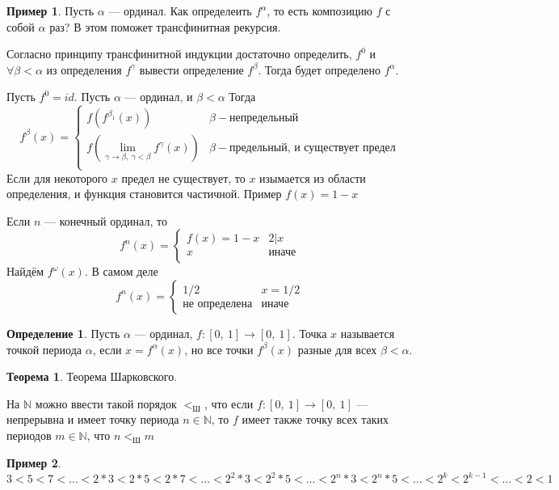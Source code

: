 \documentclass[12pt,oneside]{article}
\theoremstyle{definition}
\newtheorem{definition}{Определение}
\newtheorem{exmp}{Пример}[section]
\newtheorem{theorem}{Теорема}[section]
\begin{document}
\begin{exmp}

Пусть $\alpha$ --- ординал. Как определеить $f^{\alpha}$, то есть композицию $f$ с собой $\alpha$ раз? В этом поможет трансфинитная рекурсия.

Согласно принципу трансфинитной индукции достаточно определить, $f^0$ и $\forall \beta < \alpha$ из определения $f^{\gamma}$ вывести определение $f^{\beta}$. Тогда будет определено $f^{\alpha}$.

Пусть $f^0 = id$. Пусть $\alpha$ --- ординал, и $\beta < \alpha$ Тогда
$$f^{\beta}(x) = 
\begin{cases}
f(f^{\beta_1}(x))  & \beta - \textrm{непредельный} \\
f(\lim_{\gamma \rightarrow \beta, \ \gamma<\beta}f^{\gamma}(x)) & \beta - \textrm{предельный, и существует предел}\\
\end{cases}$$
Если для некоторого $x$ предел не существует, то $x$ изымается из области определения, и функция становится частичной.
Пример $f(x) = 1 - x$ 

Если $n$ --- конечный ординал, то 
$$ f^n(x) = \begin{cases}
f(x) = 1 - x & 2|x \\
x & \textrm{иначе} \\
\end{cases}$$
Найдём $f^{\omega}(x)$. В самом деле 
$$ f^n(x) = 
\begin{cases}
1/2 & x = 1/2 \\
\textrm{не определена} & \textrm{иначе}
\end{cases}$$
\end{exmp}

\begin{definition}
Пусть $\alpha$ --- ординал, $f\colon [0,\ 1] \longrightarrow [0,\ 1]$. Точка $x$ называется точкой периода $\alpha$, если $x=f^{\alpha}(x)$, но все точки $f^{\beta}(x)$ разные для всех $\beta < \alpha$. 
 \end{definition}
 
\begin{theorem}{Теорема Шарковского.}

 На $\mathbb{N}$ можно ввести такой порядок $<_{Ш}$, что если  $f : [0,\ 1] \longrightarrow [0,\ 1]$ --- непрерывна и имеет точку периода $n\in\mathbb{N} $, то $f$ имеет также точку всех таких периодов $m\in\mathbb{N}$, что $n<_{Ш} m$
 \end{theorem}
\begin{exmp}
$3 < 5 < 7 < \dots < 2*3 < 2*5 < 2*7 < \dots < 2^2*3 < 2^2*5 < \dots < 2^n*3 < 2^n*5 < \dots < 2^k < 2^{k-1} < \dots < 2 < 1$
\end{exmp}
\end{document}
